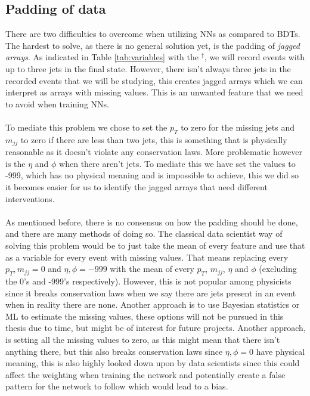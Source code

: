 \documentclass[12pt, a4paper]{book}
\begin{document}
\subsection{Padding of data}\label{sec:padding_NN}
There are two difficulties to overcome when utilizing NNs as compared to BDTs. The hardest to solve, as there is no general solution yet, is the padding of \textit{jagged arrays}. As indicated in Table \ref{tab:variables} with the $^\dagger$, we will record events 
with up to three jets in the final state. However, there isn't always three jets in the recorded events that we will be studying, this creates jagged arrays which we can interpret as arrays with missing values. This is an unwanted feature that we need to avoid when 
training NNs.\\
\\To mediate this problem we chose to set the $p_T$ to zero for the missing jets and $m_{jj}$ to zero if there are less than two jets, this is something that is physically reasonable as it doesn't violate any conservation laws. 
More problematic however is the $\eta$ and $\phi$ when there aren't jets. To mediate this we have set the values to -999, which has no physical meaning and is impossible to achieve, this we did so it becomes easier for us to identify the jagged arrays that 
need different interventions.\\
\\As mentioned before, there is no consensus on how the padding should be done, and there are many methods of doing so. The classical data scientist way of solving this problem would be to just take 
the mean of every feature and use that as a variable for every event with missing values. That means replacing every $p_T, m_{jj} = 0$ and $\eta,\phi=-999$ with the mean of every $p_T$, $m_{jj}$, $\eta$ and $\phi$ (excluding the 0's and -999's respectively). 
However, this is not popular among physicists since it breaks conservation laws when we say there are jets present in an event when in reality there are none. Another approach is to use Bayesian statistics or ML to estimate the missing values, 
these options will not be pursued in this thesis due to time, but might be of interest for future projects. Another approach, is setting all the missing values to zero, as this might mean that there isn't anything there, 
but this also breaks conservation laws since $\eta,\phi=0$ have physical meaning, this is also highly looked down upon by data scientists since this could affect the weighting when training the network and potentially create a false pattern for the network to follow which would lead to a bias.\\ 
\end{document}
